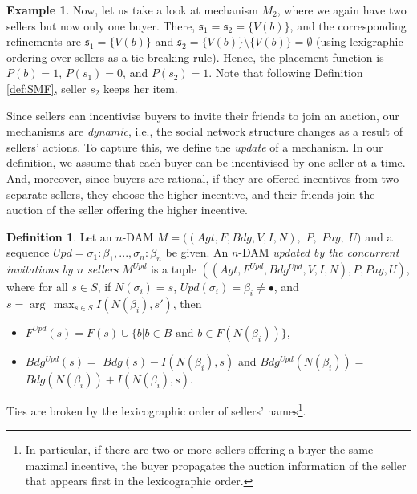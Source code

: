 \documentclass[letterpaper]{article} %
\theoremstyle{definition}
\newtheorem{definition}{Definition}
\newtheorem{example}{Example}
\newcommand{\Upd}{\mathit{Upd}}
\newcommand{\Pay}{\mathit{Pay}}
\newcommand{\laurent}[1]{{[\color{purple}#1]}}
\begin{document}
\begin{example}
Now, let us take a look at mechanism $M_2$, where we again have two sellers but now only one buyer. There, $\mathfrak{s}_1 = \mathfrak{s}_2 = \{V(b)\}$, and the corresponding refinements are $\overline{\mathfrak{s}}_1 = \{V(b)\}$ and $\overline{\mathfrak{s}}_2 = \{V(b)\} \setminus \{V(b)\} = \emptyset$ (using lexigraphic ordering over sellers as a tie-breaking rule). Hence, the placement function is $P(b) = 1$,  $P(s_1) = 0$, and $P(s_2) = 1$. Note that following Definition \ref{def:SMF},  seller $s_2$ keeps her item. 
\end{example}

Since sellers can incentivise buyers to invite their friends to join an auction, our mechanisms are \textit{dynamic}, i.e., the social network structure changes as a result of sellers' actions. To capture this, we define the \textit{update} of a mechanism.  In our definition, we assume that each buyer can be incentivised by one seller at a time. And, moreover, since buyers are rational, if they are offered incentives from two separate sellers, they choose the higher incentive, and their friends join the auction of the seller offering the higher incentive. 

\begin{definition}
    Let an $n$-DAM $M = ((Agt, F, Bdg, V, I, N),$ $P,$ $\Pay,$ $U)$ and a sequence $\Upd = \sigma_1: \beta_1, ..., \sigma_n: \beta_n$ be given. An $n$-DAM \emph{updated by the concurrent invitations by $n$ sellers} %
    $M^{\Upd}$ is a tuple $((Agt, F^{\Upd}, Bdg^{\Upd}, V, I, N), P, \Pay, U)$, where for all $s \in S$, if $N(\sigma_i) = s$, $\Upd(\sigma_i) = \beta_i \neq \bullet$,   and $s = \arg\,\max_{s\in S}I(N(\beta_i),s')$, then
    \begin{itemize}
        \item  %
        $F^{\Upd}(s) = F(s) \cup \{b | b \in B \text{ and }b \in F(N(\beta_i))\}$,
        \item %
        $Bdg^{\Upd}(s) =$ $Bdg(s) - I(N(\beta_i),s)$ and $Bdg^{\Upd}(N(\beta_i)) =$ $Bdg(N(\beta_i)) + I(N(\beta_i),s)$.
    \end{itemize}
    Ties are broken by the lexicographic order of sellers' names\footnote{In particular, if there are two or more sellers offering a buyer the same maximal incentive, the buyer propagates the auction information of the seller that appears first in the lexicographic order.}.
\end{definition}
\end{document}
